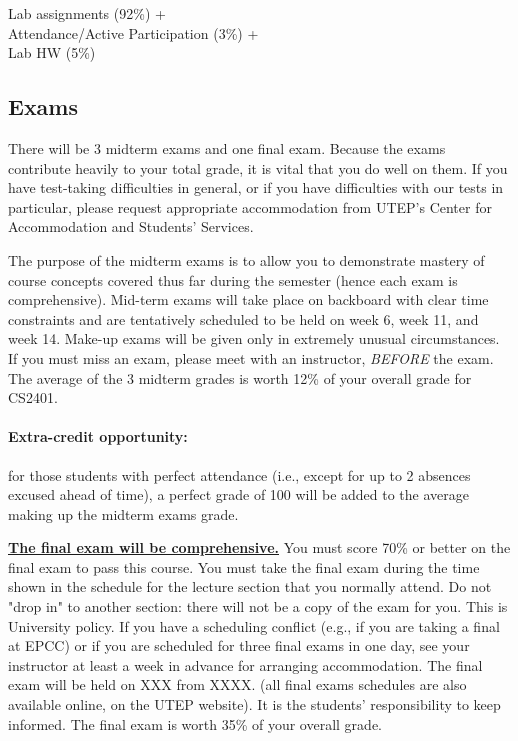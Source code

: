 \documentclass[12pt]{scrartcl}
\newcommand{\change}[2]{#2}
\begin{document}
\begin{tcolorbox}[colback=blue!5,colframe=blue!75!black,title=Lab Grade]
\begin{center}

Lab assignments (92\%) + \\
Attendance/Active Participation (3\%) +\\
 Lab HW (5\%)
\end{center}

\end{tcolorbox}

\subsection{Exams}
There will be 3 midterm exams and one final exam. 
Because the exams contribute heavily to your total grade, it is vital that you do well on them. 
If you have test-taking difficulties in general, or if you have difficulties with our tests in particular, please request appropriate accommodation from UTEP’s Center for Accommodation and Students’ Services.

The purpose of the midterm exams is to allow you to demonstrate mastery of course concepts covered thus far during the semester (hence each exam is comprehensive). 
Mid-term exams will take place \change{during the regular lecture sessions}{on backboard with clear time constraints} and are tentatively scheduled to be held on week 6, week 11, and week 14. 
Make-up exams will be given only in extremely unusual circumstances. 
If you must miss an exam, please meet with an instructor, \textit{BEFORE} the exam. 
The average of the 3 midterm grades is worth 12\% of your overall grade for CS2401.
 
\paragraph{Extra-credit opportunity:} 
for those students with perfect attendance (i.e., except for up to 2 absences excused ahead of time), a perfect grade of 100 will be added to the average making up the midterm exams grade.

\textbf{\underline{The final exam will be comprehensive.}}
You must score 70\% or better on the final exam to pass this course. 
You must take the final exam during the time shown in the schedule for the lecture section that you normally attend. 
Do not "drop in" to another section: there will not be a copy of the exam for you. 
This is University policy. If you have a scheduling conflict (e.g., if you are taking a final at EPCC) or if you are scheduled for three final exams in one day, see your instructor at least a week in advance for arranging accommodation.
 The final exam will be held on {\color{red}XXX from XXXX}. (all final exams schedules are also available online, on the UTEP website). 
 It is the students’ responsibility to keep informed. The final exam is worth 35\% of your overall grade. 
\end{document}
